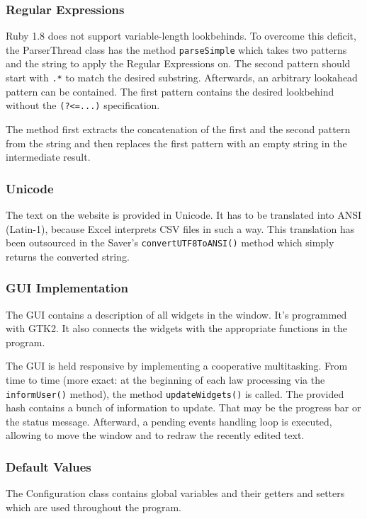 \documentclass{scrartcl}
\begin{document}
\subsubsection{Regular Expressions}
Ruby 1.8 does not support variable-length lookbehinds. To overcome this deficit, the ParserThread class has the method \texttt{parseSimple} which takes two patterns and the string to apply the Regular Expressions on. The second pattern should start with \texttt{.*} to match the desired substring. Afterwards, an arbitrary lookahead pattern can be contained. The first pattern contains the desired lookbehind without the \texttt{(?<=...)} specification.

The method first extracts the concatenation of the first and the second pattern from the string and then replaces the first pattern with an empty string in the intermediate result. 

\subsubsection{Unicode}
The text on the website is provided in Unicode. It has to be translated into ANSI (Latin-1), because Excel interprets CSV files in such a way. This translation has been outsourced in the Saver's \texttt{convertUTF8ToANSI()} method which simply returns the converted string.

\subsubsection{GUI Implementation}
The GUI contains a description of all widgets in the window. It's programmed with GTK2. It also connects the widgets with the appropriate functions in the program.

The GUI is held responsive by implementing a cooperative multitasking. From time to time (more exact: at the beginning of each law processing via the \texttt{informUser()} method), the method \texttt{updateWidgets()} is called. The provided hash contains a bunch of information to update. That may be the progress bar or the status message. Afterward, a pending events handling loop is executed, allowing to move the window and to redraw the recently edited text.

\subsubsection{Default Values}
The Configuration class contains global variables and their getters and setters which are used throughout the program.
\end{document}
